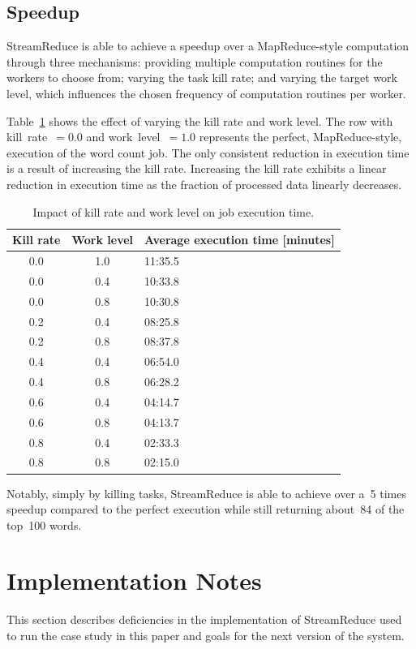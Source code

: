 \documentclass[12pt,twocolumn]{article}
\begin{document}
\subsection{Speedup}
StreamReduce is able to achieve a speedup over a MapReduce-style computation through three mechanisms:
providing multiple computation routines for the workers to choose from; varying the task kill
rate; and varying the target work level, which influences the chosen frequency of computation
routines per worker.

Table~\ref{table:runtime} shows the effect of varying the kill rate and work level. The row
with kill~rate~$=0.0$ and work~level~$=1.0$ represents the perfect, MapReduce-style, execution
of the word count job. The only consistent reduction in execution time is a result of
increasing the kill rate. Increasing the kill rate exhibits a linear reduction in execution
time as the fraction of processed data linearly decreases.

\begin{table}
\begin{tabularx}{\linewidth}{|c|c|X|}
\hline
Kill rate & Work level & Average execution time [minutes] \\ \hline
0.0 & 1.0 & 11:35.5 \\ \hline
0.0 & 0.4 & 10:33.8 \\ \hline
0.0 & 0.8 & 10:30.8 \\ \hline
0.2 & 0.4 & 08:25.8 \\ \hline
0.2 & 0.8 & 08:37.8 \\ \hline
0.4 & 0.4 & 06:54.0 \\ \hline
0.4 & 0.8 & 06:28.2 \\ \hline
0.6 & 0.4 & 04:14.7 \\ \hline
0.6 & 0.8 & 04:13.7 \\ \hline
0.8 & 0.4 & 02:33.3 \\ \hline
0.8 & 0.8 & 02:15.0 \\ \hline
\end{tabularx}
\caption{Impact of kill rate and work level on job execution time.}
\label{table:runtime}
\end{table}

Notably, simply by killing tasks, StreamReduce is able to achieve over a~5 times speedup compared
to the perfect execution while still returning about~84 of the top~100 words.

\section{Implementation Notes}
\label{sec:discussion}
This section describes deficiencies in the implementation of StreamReduce used to run the case study
in this paper and goals for the next version of the system.
\end{document}
